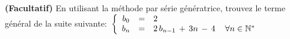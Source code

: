 \documentclass[11pt]{article}
\newcommand{\REMISE}[1]{}
\newcommand{\ensembleN}{{\mathbb{N}}}  %
\newcounter{exercice}\newcommand{\exercice}{ \bigskip \addtocounter{exercice}{1}\noindent \textbf{Exercice \theexercice}\\}
\newcommand{\reponse}[1]{\REMISE{\vspace{.5cm}\noindent\textbf{Réponse : } #1 \newpage}}
\begin{document}
\reponse{
}

\exercice
\textbf{(Facultatif)} En utilisant la méthode par série génératrice, trouvez le terme général de la suite suivante:
$\\ \left\{
\begin{array}{cclr}
  b_0 & = & 2 \,\, &  \\
  b_n & = & 2\,b_{n-1}\,+\,3n\,-\,4& \, \forall n\in\ensembleN^\ast \\
\end{array}%
\right.$  \\[1mm]
 
\reponse{
}



\vfill
\vfill\vfill\vfill\vfill\vfill\vfill\vfill
\end{document}
